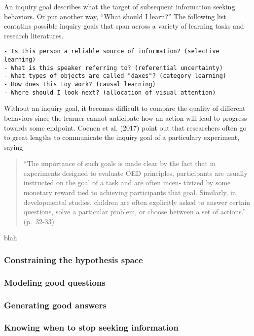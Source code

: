 \documentclass[a4paper,man,apacite,floatsintext]{apa6}
\begin{document}
An inquiry goal describes what the target of subsequent information
seeking behaviors. Or put another way, ``What should I learn?'' The
following list contatins possible inquiry goals that span across a
variety of learning tasks and research literatures.

\begin{verbatim}
- Is this person a reliable source of information? (selective learning)
- What is this speaker referring to? (referential uncertainty)
- What types of objects are called "daxes"? (category learning)
- How does this toy work? (causal learning)
- Where should I look next? (allocation of visual attention)
\end{verbatim}

Without an inquiry goal, it becomes difficult to compare the quality of
different behaviors since the learner cannot anticipate how an action
will lead to progress towards some endpoint. Coenen et al. (2017) point
out that researchers often go to great lengths to communicate the
inquiry goal of a particulary experiment, saying

\begin{quote}
``The importance of such goals is made clear by the fact that in
experiments designed to evaluate OED principles, participants are
usually instructed on the goal of a task and are often incen- tivized by
some monetary reward tied to achieving participants that goal.
Similarly, in developmental studies, children are often explicitly asked
to answer certain questions, solve a particular problem, or choose
between a set of actions.'' (p.~32-33)
\end{quote}

blah

\subsubsection{Constraining the hypothesis
space}\label{constraining-the-hypothesis-space}

\subsubsection{Modeling good questions}\label{modeling-good-questions}

\subsubsection{Generating good answers}\label{generating-good-answers}

\subsubsection{Knowing when to stop seeking
information}\label{knowing-when-to-stop-seeking-information}
\end{document}
